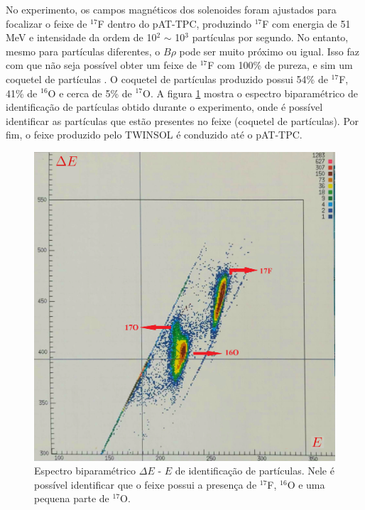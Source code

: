 \documentclass[a4paper,12pt,oneside]{book}
\begin{document}

\par No experimento, os campos magnéticos dos solenoides foram ajustados para focalizar o feixe de $^{17}$F dentro do pAT-TPC, produzindo $^{17}$F com energia de 51 MeV e intensidade da ordem de 10$^2$ $\sim$ 10$^3$ partículas por segundo. No entanto, mesmo para partículas diferentes, o $B\rho$ pode ser muito próximo ou igual. Isso faz com que não seja possível obter um feixe de $^{17}$F com 100\% de pureza, e sim um coquetel de partículas \cite{zamora_mater}. O coquetel de partículas produzido possui 54\% de $^{17}$F, 41\% de $^{16}$O e cerca de 5\% de $^{17}$O. A figura \ref{fig:PID_17F} mostra o espectro biparamétrico de identificação de partículas obtido durante o experimento, onde é possível identificar as partículas que estão presentes no feixe (coquetel de partículas). Por fim, o feixe produzido pelo TWINSOL é conduzido até o pAT-TPC.

\begin{figure}[H]
    \centering
    \includegraphics[scale = 0.12]{figs/pid_17F.png}
    \caption{Espectro biparamétrico $\Delta E$ - $E$ de identificação de partículas. Nele é possível identificar que o feixe possui a presença de $^{17}$F, $^{16}$O e uma pequena parte de $^{17}$O.}
    \label{fig:PID_17F}
\end{figure}
\end{document}
